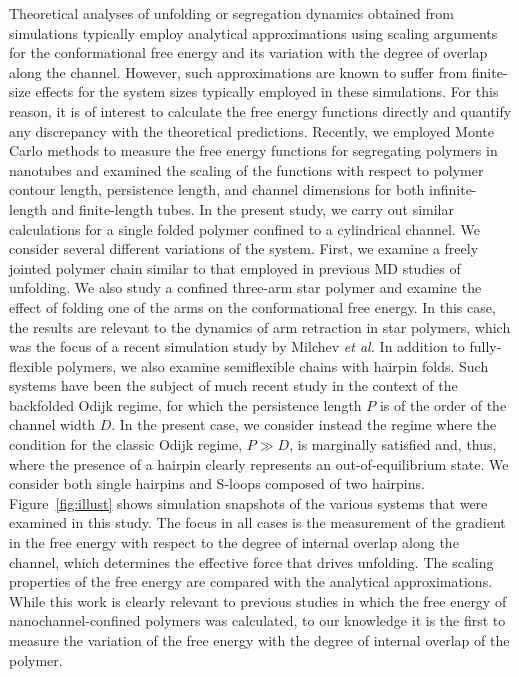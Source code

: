 \documentclass[journal=mamobx,manuscript=article,layout=twocolumn]{achemso}
\begin{document}
Theoretical analyses of unfolding or segregation dynamics obtained from simulations
typically employ analytical approximations using scaling arguments for the conformational 
free energy and its variation with the degree of overlap along the channel. However, 
such approximations are known to suffer from finite-size effects for the system
sizes typically employed in these simulations.\cite{kim2013elasticity} 
For this reason, it is of interest to calculate the free energy functions 
directly and quantify any discrepancy with the theoretical predictions.
Recently, we employed Monte Carlo methods to measure the free energy functions
for segregating polymers in nanotubes and examined the scaling of the functions
with respect to polymer contour length, persistence length, and channel dimensions for
both infinite-length and finite-length tubes.\cite{polson2014polymer} In the present study,
we carry out similar calculations for a single folded polymer confined to a cylindrical
channel. We consider several different variations of the system. First, we examine
a freely jointed polymer chain similar to that employed in previous MD studies of 
unfolding.\cite{ibanez2012entropic,ibanez2013hairpin} We also study a confined three-arm 
star polymer and examine the effect of folding one of the arms on the conformational
free energy. In this case, the results are relevant to the dynamics of arm 
retraction in star polymers, which was the focus of a recent simulation study by
Milchev {\it et al.}\cite{milchev2014arm} In addition to fully-flexible polymers, we
also examine semiflexible chains with hairpin folds. Such systems have been
the subject of much recent study in the context of the backfolded Odijk regime, for which
the persistence length $P$ is of the order of the channel width $D$.\cite{%
muralidhar2014backfolding,muralidhar2016backfolding,muralidhar2016backfolded,werner2016emergence}
In the present case, we consider instead the regime where the condition for the classic
Odijk regime, $P\gg D$, is marginally satisfied and, thus, where the presence of a hairpin 
clearly represents an out-of-equilibrium state. We consider both single hairpins and
S-loops composed of two hairpins. Figure~\ref{fig:illust} shows simulation snapshots of 
the various systems that were examined in this study. The focus in all cases is the 
measurement of the gradient in the free energy with respect to the degree of internal overlap
along the channel, which determines the effective force that drives unfolding. 
The scaling properties of the free energy are compared with the analytical approximations.
While this work is clearly relevant to previous studies in which the free energy
of nanochannel-confined polymers was calculated, to our knowledge it is the first to measure 
the variation of the free energy with the degree of internal overlap of the polymer.
\end{document}
